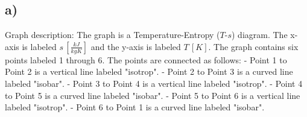 

\subsection*{a)}
Graph description: The graph is a Temperature-Entropy ($T$-$s$) diagram. The x-axis is labeled $s \, \left[\frac{kJ}{kgK}\right]$ and the y-axis is labeled $T \, [K]$. The graph contains six points labeled 1 through 6. The points are connected as follows:
- Point 1 to Point 2 is a vertical line labeled "isotrop".
- Point 2 to Point 3 is a curved line labeled "isobar".
- Point 3 to Point 4 is a vertical line labeled "isotrop".
- Point 4 to Point 5 is a curved line labeled "isobar".
- Point 5 to Point 6 is a vertical line labeled "isotrop".
- Point 6 to Point 1 is a curved line labeled "isobar".